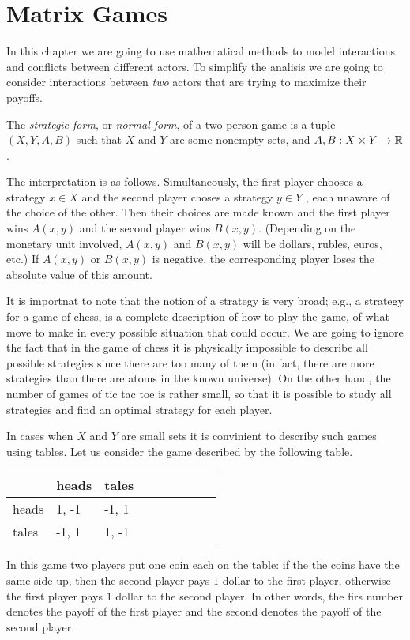 \chapter{Matrix Games}
In this chapter we are going to use mathematical methods to model interactions
and conflicts between different actors. To simplify the analisis we are going to
consider interactions between \emph{two} actors that are trying to maximize
their payoffs.

\begin{definition}
  The \emph{strategic form}, or \emph{normal form}, of a two-person game is
  a tuple $(X, Y, A, B)$ such that $X$ and $Y$ are some nonempty sets, and 
  $A, B  : X \times Y \to {\mathbb{R}}$.
\end{definition}
The interpretation is as follows. Simultaneously, the first player chooses 
a strategy $x \in X$ and the second player choses a strategy $y \in Y$ , each
unaware of the choice of the other. Then their choices are made known and the
first player wins $A(x, y)$ and the second player wins $B(x, y)$. (Depending on
the monetary unit involved, $A(x, y)$ and $B(x, y)$ will be dollars, rubles,
euros, etc.) If $A(x, y)$ or $B(x, y)$ is negative, the corresponding player
loses the absolute value of this amount.

It is importnat to note that the notion of a strategy is very broad; e.g., a
strategy for a game of chess, is a complete description of how to play the game,
of what move to make in every possible situation that could occur. We are going
to ignore the fact that in the game of chess it is physically impossible to
describe all possible strategies since there are too many of them (in fact,
there are more strategies than there are atoms in the known universe). On the
other hand, the number of games of tic tac toe is rather small, so that it is
possible to study all strategies and find an optimal strategy for each player.

In cases when $X$ and $Y$ are small sets it is convinient to describy such games
using tables. Let us consider the game described by the following table.
\begin{center}
  \begin{tabular}{l l l  l  l  l  l  l  l}
    \toprule
          & heads  & tales   \\
    \midrule
    heads & 1, -1 & -1, 1   \\
    tales & -1, 1 & 1, -1   \\
    \bottomrule
  \end{tabular}
\end{center}
In this game two players put one coin each on the table: if the the coins have
the same side up, then the second player pays $1$ dollar to the first player,
otherwise the first player pays $1$ dollar to the second player. In other words,
the firs number denotes the payoff of the first player and the second denotes
the payoff of the second player.


